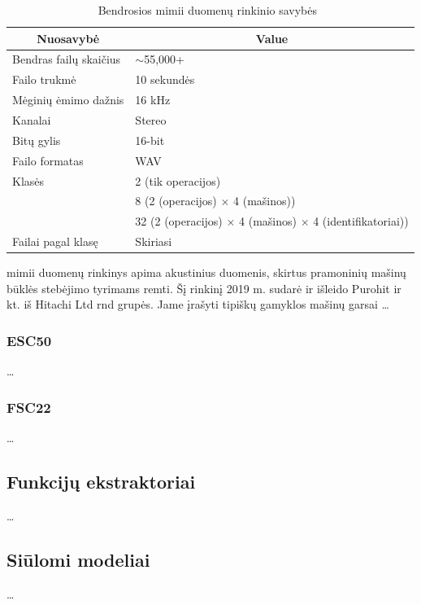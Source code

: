 \begin{table}[!ht]
	\centering
	\caption[Bendrosios MIMII duomenų rinkinio savybės]{Bendrosios \gls{mimii} duomenų rinkinio savybės~\citep{Purohit2019}}
	\label{tab:mimii_propertiesslt}
	\small
	\begin{tabular}{ll}
		\hline
		\multicolumn{1}{c}{\textbf{Nuosavybė}} & \multicolumn{1}{c}{\textbf{Value}} \\
		\hline
		Bendras failų skaičius & $\sim$55,000+ \\
		Failo trukmė & 10 sekundės \\
		Mėginių ėmimo dažnis & 16 kHz \\
		Kanalai & Stereo \\
		Bitų gylis & 16-bit \\
		Failo formatas & WAV \\
		Klasės & 2 (tik operacijos)\\
		& 8 (2 (operacijos) $\times$ 4 (mašinos))\\
		& 32 (2 (operacijos) $\times$ 4 (mašinos) $\times$ 4 (identifikatoriai))\\
		Failai pagal klasę & Skiriasi\\
		\hline
	\end{tabular}
\end{table}

\gls{mimii} duomenų rinkinys apima akustinius duomenis, skirtus pramoninių mašinų būklės stebėjimo tyrimams remti. Šį rinkinį 2019 m. sudarė ir išleido Purohit ir kt. iš Hitachi Ltd \gls{rnd} grupės. Jame įrašyti tipiškų gamyklos mašinų garsai \dots
\subsubsection*{ESC50}
\dots

\subsubsection*{FSC22}
\dots
\subsection*{Funkcijų ekstraktoriai}
\dots
\subsection*{Siūlomi modeliai}
\dots
